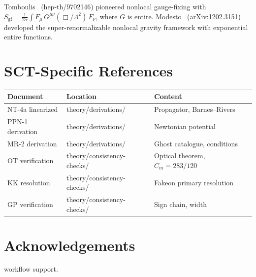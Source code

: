\documentclass[11pt,a4paper]{article}
\theoremstyle{remark}
\begin{document}
Tomboulis~\cite{Tomboulis1997} (hep-th/9702146) pioneered nonlocal
gauge-fixing with $S_{\mathrm{gf}} = \tfrac{1}{2\alpha}\int F_\mu\,
G^{\mu\nu}(\Box/\Lambda^2)\, F_\nu$, where $G$ is entire.
Modesto~\cite{Modesto2012} (arXiv:1202.3151) developed the
super-renormalizable nonlocal gravity framework with exponential
entire functions.

\section{SCT-Specific References}

\begin{longtable}{@{}lll@{}}
\toprule
Document & Location & Content \\
\midrule
NT-4a linearized & theory/derivations/ & Propagator, Barnes--Rivers \\
PPN-1 derivation & theory/derivations/ & Newtonian potential \\
MR-2 derivation & theory/derivations/ & Ghost catalogue, conditions \\
OT verification & theory/consistency-checks/ & Optical theorem, $C_m = 283/120$ \\
KK resolution & theory/consistency-checks/ & Fakeon primary resolution \\
GP verification & theory/consistency-checks/ & Sign chain, width \\
\bottomrule
\end{longtable}

\section*{Acknowledgements}

workflow support.
\end{document}
